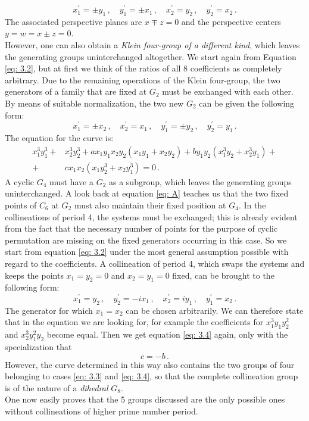 \documentclass[leqno]{article}
\begin{document}
\[
x_1^\prime = \pm y_1 \, , \quad y_1^\prime = \pm x_1 \, , \quad x_2^\prime = y_2 \, , \quad y_2^\prime = x_2 \, .
\]
The associated perspective planes are $x \mp z = 0$ and the perspective centers $y=w = x \pm z=0$. \\
However, one can also obtain a \textit{Klein four-group of a different kind}, which leaves the generating groups uninterchanged altogether. We start again from Equation \eqref{eq: 3.2}, but at first we think of the ratios of all 8 coefficients as completely arbitrary. Due to the remaining operations of the Klein four-group, the two generators of a family that are fixed at $G_2$ must be exchanged with each other. By means of suitable normalization, the two new $G_2$ can be given the following form:
\[
x_1^\prime = \pm x_2 \, , \quad x_2^\prime = x_1 \, , \quad y_1^\prime = \pm y_2 \, , \quad y_2^\prime = y_1 \, .
\]
The equation for the curve is:
\begin{align}\label{eq: 3.4}
	x_1^3 y_1^3 +& x_2^3 y_2^3 + ax_1 y_1 x_2 y_2 (x_1 y_1 + x_2 y_2) + b y_1 y_2 (x_1^3 y_2 + x_2^3 y_1) + \tag{4} \\ 
	+& c x_1 x_2 (x_1 y_2^3 + x_2 y_1^3) = 0 \, .  \nonumber 
\end{align}
A cyclic $G_4$ must have a $G_2$ as a subgroup, which leaves the generating groups uninterchanged. A look back at equation \eqref{eq: A} teaches us that the two fixed points of $C_6$ at $G_2$ must also maintain their fixed position at $G_4$. In the collineations of period 4, the systems must be exchanged; this is already evident from the fact that the necessary number of points for the purpose of cyclic permutation are missing on the fixed generators occurring in this case. So we start from equation \eqref{eq: 3.2} under the most general assumption possible with regard to the coefficients. A collineation of period 4, which swaps the systems and keeps the points $x_1 = y_2 =0$ and $x_2 = y_1 = 0$ fixed, can be brought to the following form:
\[
x_1^\prime = y_2 \, , \quad y_2^\prime = -ix_1 \, , \quad x_2^\prime = iy_1 \, , \quad y_1^\prime = x_2 \, .
\]
 The generator for which $x_1=x_2$ can be chosen arbitrarily. We can therefore state that in the equation we are looking for, for example the coefficients for $x_1^3 y_1 y_2^2$ and $x_2^3 y_1^2 y_2$ become equal. Then we get equation \eqref{eq: 3.4} again, only with the specialization that
\begin{equation}\label{eq: 3.5}
c = -b \, . \tag{5} 
\end{equation}
However, the curve determined in this way also contains the two groups of four belonging to cases \eqref{eq: 3.3} and \eqref{eq: 3.4}, so that the complete collineation group is of the nature of a \textit{dihedral} $G_8$. \\
One now easily proves that the 5 groups discussed are the only possible ones without collineations of higher prime number period.
\end{document}
